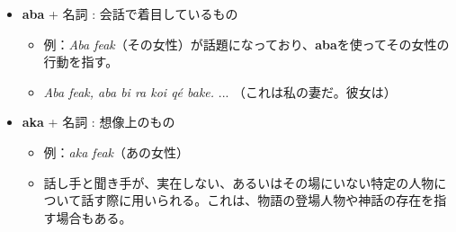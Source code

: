\begin{itemize}
    \item \textbf{aba} + 名詞 : 会話で着目しているもの
    \begin{itemize}
        \item 例：\textit{Aba feak}（その女性）が話題になっており、\textbf{aba}を使ってその女性の行動を指す。
        \item \textit{Aba feak, aba bi ra koi q\'e bake.} ... （これは私の妻だ。彼女は）
    \end{itemize}
    \item \textbf{aka} + 名詞 : 想像上のもの
    \begin{itemize}
        \item 例：\textit{aka feak}（あの女性）
        \item 話し手と聞き手が、実在しない、あるいはその場にいない特定の人物について話す際に用いられる。これは、物語の登場人物や神話の存在を指す場合もある。
    \end{itemize}
\end{itemize}